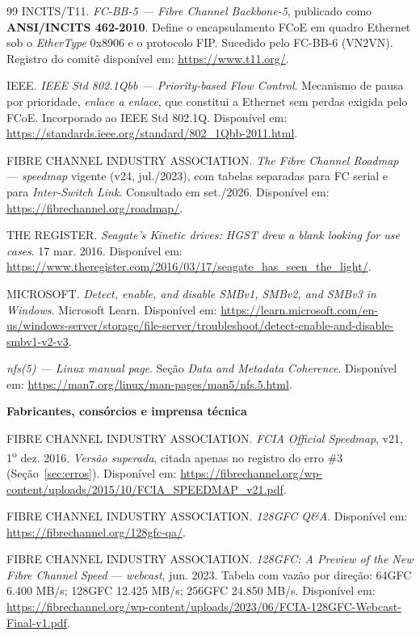 \documentclass[11pt,a4paper]{article}
\begin{document}
\begin{thebibliography}{99}
 INCITS/T11. \textit{FC-BB-5 --- Fibre Channel Backbone-5}, publicado como
\textbf{ANSI/INCITS 462-2010}. Define o encapsulamento FCoE em quadro Ethernet sob o \textit{EtherType}
0x8906 e o protocolo FIP. Sucedido pelo FC-BB-6 (VN2VN). Registro do comitê disponível em:
\url{https://www.t11.org/}.

 IEEE. \textit{IEEE Std 802.1Qbb --- Priority-based Flow Control}. Mecanismo de
pausa por prioridade, \emph{enlace a enlace}, que constitui a Ethernet sem perdas exigida pelo FCoE.
Incorporado ao IEEE Std 802.1Q. Disponível em: \url{https://standards.ieee.org/standard/802_1Qbb-2011.html}.

 FIBRE CHANNEL INDUSTRY ASSOCIATION. \textit{The Fibre Channel Roadmap} ---
\textit{speedmap} vigente (v24, jul./2023), com tabelas separadas para FC serial e para
\textit{Inter-Switch Link}. Consultado em set./2026. Disponível em:
\url{https://fibrechannel.org/roadmap/}.

 THE REGISTER. \textit{Seagate's Kinetic drives: HGST drew a blank looking
for use cases}. 17 mar. 2016. Disponível em: \url{https://www.theregister.com/2016/03/17/seagate_has_seen_the_light/}.

 MICROSOFT. \textit{Detect, enable, and disable SMBv1, SMBv2, and SMBv3 in
Windows}. Microsoft Learn. Disponível em:
\url{https://learn.microsoft.com/en-us/windows-server/storage/file-server/troubleshoot/detect-enable-and-disable-smbv1-v2-v3}.

 \textit{nfs(5) --- Linux manual page}. Seção \textit{Data and Metadata Coherence}.
Disponível em: \url{https://man7.org/linux/man-pages/man5/nfs.5.html}.

\smallskip
\item[]\textbf{Fabricantes, consórcios e imprensa técnica}

 FIBRE CHANNEL INDUSTRY ASSOCIATION. \textit{FCIA Official Speedmap}, v21,
1\textsuperscript{o} dez. 2016. \emph{Versão superada}, citada apenas no registro do erro \#3 (Seção~\ref{sec:erros}). Disponível em:
\url{https://fibrechannel.org/wp-content/uploads/2015/10/FCIA_SPEEDMAP_v21.pdf}.

 FIBRE CHANNEL INDUSTRY ASSOCIATION. \textit{128GFC Q\&A}. Disponível em:
\url{https://fibrechannel.org/128gfc-qa/}.

 FIBRE CHANNEL INDUSTRY ASSOCIATION. \textit{128GFC: A Preview of the New Fibre
Channel Speed} --- \textit{webcast}, jun. 2023. Tabela com vazão por direção: 64GFC 6.400 MB/s; 128GFC
12.425 MB/s; 256GFC 24.850 MB/s. Disponível em:
\url{https://fibrechannel.org/wp-content/uploads/2023/06/FCIA-128GFC-Webcast-Final-v1.pdf}.


\end{thebibliography}
\end{document}

